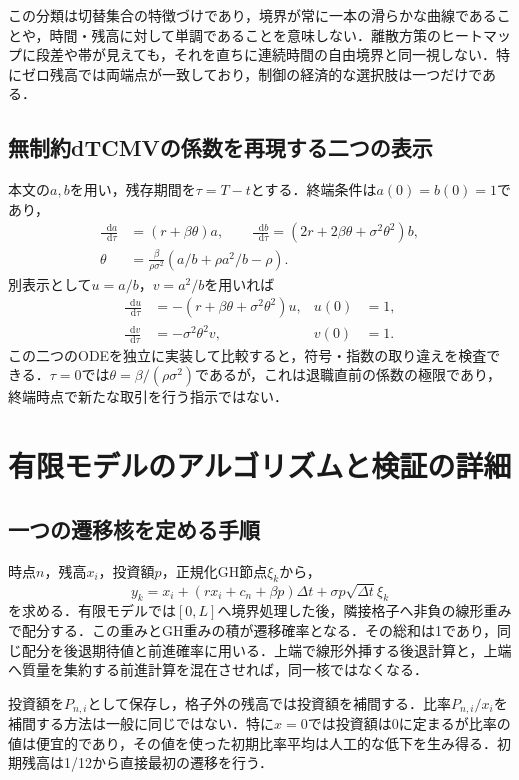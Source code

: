 \documentclass[11pt,a4paper]{article}
\numberwithin{equation}{section}
\numberwithin{table}{section}
\numberwithin{figure}{section}
\theoremstyle{plain}
\theoremstyle{definition}
\newcommand{\dd}{\mathop{}\!\mathrm{d}}
\begin{document}
この分類は切替集合の特徴づけであり，境界が常に一本の滑らかな曲線であることや，時間・残高に対して単調であることを意味しない．離散方策のヒートマップに段差や帯が見えても，それを直ちに連続時間の自由境界と同一視しない．特にゼロ残高では両端点が一致しており，制御の経済的な選択肢は一つだけである．

\subsection{無制約dTCMVの係数を再現する二つの表示}
本文の$a,b$を用い，残存期間を$\tau=T-t$とする．終端条件は$a(0)=b(0)=1$であり，
\begin{align}
\frac{\dd a}{\dd\tau}&=(r+\beta\theta)a,\qquad
\frac{\dd b}{\dd\tau}=(2r+2\beta\theta+\sigma^2\theta^2)b,\\
\theta&=\frac{\beta}{\rho\sigma^2}(a/b+\rho a^2/b-\rho).
\end{align}
別表示として$u=a/b$，$v=a^2/b$を用いれば
\begin{align}
\frac{\dd u}{\dd\tau}&=-(r+\beta\theta+\sigma^2\theta^2)u,
&u(0)&=1,\\
\frac{\dd v}{\dd\tau}&=-\sigma^2\theta^2v,
&v(0)&=1.
\end{align}
この二つのODEを独立に実装して比較すると，符号・指数の取り違えを検査できる．$\tau=0$では$\theta=\beta/(\rho\sigma^2)$であるが，これは退職直前の係数の極限であり，終端時点で新たな取引を行う指示ではない．

\FloatBarrier
\section{有限モデルのアルゴリズムと検証の詳細}
\label{app:algorithm}
\subsection{一つの遷移核を定める手順}
時点$n$，残高$x_i$，投資額$p$，正規化GH節点$\xi_k$から，
\begin{equation}
y_k=x_i+(rx_i+c_n+\beta p)\Delta t+\sigma p\sqrt{\Delta t}\xi_k
\end{equation}
を求める．有限モデルでは$[0,L]$へ境界処理した後，隣接格子へ非負の線形重みで配分する．この重みとGH重みの積が遷移確率となる．その総和は1であり，同じ配分を後退期待値と前進確率に用いる．上端で線形外挿する後退計算と，上端へ質量を集約する前進計算を混在させれば，同一核ではなくなる．

投資額を$P_{n,i}$として保存し，格子外の残高では投資額を補間する．比率$P_{n,i}/x_i$を補間する方法は一般に同じではない．特に$x=0$では投資額は0に定まるが比率の値は便宜的であり，その値を使った初期比率平均は人工的な低下を生み得る．初期残高は1/12から直接最初の遷移を行う．
\end{document}
